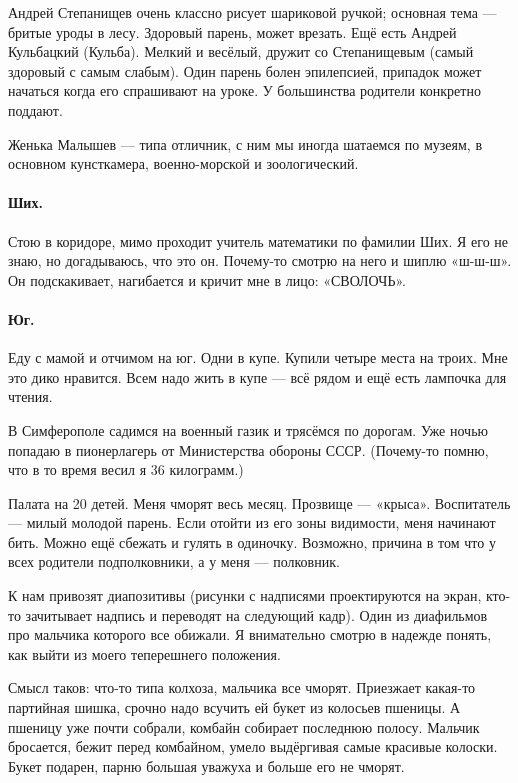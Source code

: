 \documentclass{book}
\begin{document}
Андрей Степанищев очень классно рисует шариковой ручкой;
основная тема --- бритые уроды в лесу.
Здоровый парень, может врезать.
Ещё есть Андрей Кульбацкий (Кульба).
Мелкий и весёлый, дружит со Степанищевым
(самый здоровый с самым слабым).
Один парень болен эпилепсией,
припадок может начаться когда его спрашивают на уроке.
У большинства родители конкретно поддают.

Женька Малышев --- типа отличник,
с ним мы иногда шатаемся по музеям, 
в основном кунсткамера, военно-морской и зоологический.

\paragraph{Ших.}
Стою в коридоре, мимо проходит учитель математики по фамилии Ших.
Я его не знаю, но догадываюсь, что это он.
Почему-то смотрю на него и шиплю «ш-ш-ш».
Он подскакивает, нагибается и кричит мне в лицо: «СВОЛОЧЬ».

\paragraph{Юг.}
Еду с мамой и отчимом на юг.
Одни в купе. 
Купили четыре места на троих.
Мне это дико нравится. 
Всем надо жить в купе ---
всё рядом и ещё есть лампочка для чтения.

В Симферополе садимся на военный газик и трясёмся по дорогам. 
Уже ночью попадаю в пионерлагерь от Министерства обороны СССР.
(Почему-то помню, что в то время весил я 36 килограмм.)

Палата на 20 детей.
Меня чморят весь месяц.
Прозвище --- «крыса».
Воспитатель --- милый молодой парень.
Если отойти из его зоны видимости, меня начинают бить.
Можно ещё сбежать и гулять в одиночку.
Возможно, причина в том что у всех родители подполковники, а у меня --- полковник.

К нам привозят диапозитивы (рисунки с надписями проектируются на экран,
кто-то зачитывает надпись и переводят на следующий кадр).
Один из диафильмов про мальчика которого все обижали.
Я внимательно смотрю в надежде понять, как выйти из моего теперешнего положения.

Смысл таков: что-то типа колхоза, 
мальчика все чморят.
Приезжает какая-то партийная шишка,
срочно надо всучить ей букет из колосьев пшеницы.
А пшеницу уже почти собрали,
комбайн собирает последнюю полосу.
Мальчик бросается, бежит перед комбайном, умело выдёргивая самые красивые колоски.
Букет подарен, парню большая уважуха и больше его не чморят.
\end{document}
